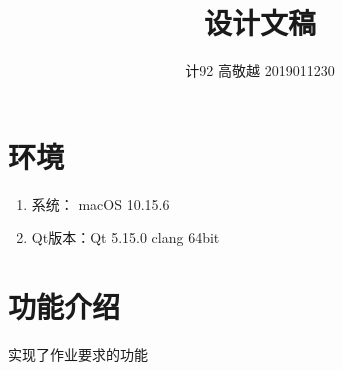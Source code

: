 \documentclass[utf-8]{ctexart}
\begin{document}
\title{设计文稿}
\author{计92 高敬越 2019011230}
\date{ }
    \maketitle
    \vspace{-2em}
    \section{环境}
    \begin{enumerate}
        \item 系统： macOS 10.15.6
        \item Qt版本：Qt 5.15.0 clang 64bit 
    \end{enumerate}
    \section{功能介绍}
    实现了作业要求的功能
\end{document}

